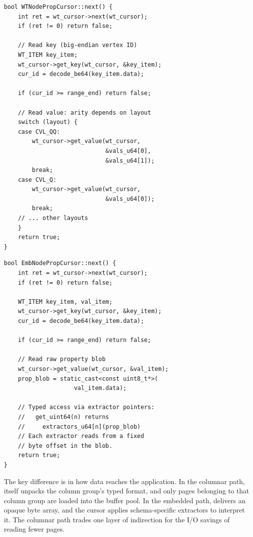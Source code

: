 \begin{lstlisting}[style=cpp, label={lst:wt-next}, caption={Columnar path: \code{WTNodePropCursor::next()}.}, captionpos=b]
bool WTNodePropCursor::next() {
    int ret = wt_cursor->next(wt_cursor);
    if (ret != 0) return false;

    // Read key (big-endian vertex ID)
    WT_ITEM key_item;
    wt_cursor->get_key(wt_cursor, &key_item);
    cur_id = decode_be64(key_item.data);

    if (cur_id >= range_end) return false;

    // Read value: arity depends on layout
    switch (layout) {
    case CVL_QQ:
        wt_cursor->get_value(wt_cursor,
                             &vals_u64[0],
                             &vals_u64[1]);
        break;
    case CVL_Q:
        wt_cursor->get_value(wt_cursor,
                             &vals_u64[0]);
        break;
    // ... other layouts
    }
    return true;
}
\end{lstlisting}

\begin{lstlisting}[style=cpp, label={lst:emb-next}, caption={Embedded path: \code{EmbNodePropCursor::next()}.}, captionpos=b]
bool EmbNodePropCursor::next() {
    int ret = wt_cursor->next(wt_cursor);
    if (ret != 0) return false;

    WT_ITEM key_item, val_item;
    wt_cursor->get_key(wt_cursor, &key_item);
    cur_id = decode_be64(key_item.data);

    if (cur_id >= range_end) return false;

    // Read raw property blob
    wt_cursor->get_value(wt_cursor, &val_item);
    prop_blob = static_cast<const uint8_t*>(
                    val_item.data);

    // Typed access via extractor pointers:
    //   get_uint64(n) returns
    //     extractors_u64[n](prop_blob)
    // Each extractor reads from a fixed
    // byte offset in the blob.
    return true;
}
\end{lstlisting}

The key difference is in how data reaches the application.
In the columnar path, \wt{} itself unpacks the column group's typed format, and only pages belonging to that column group are loaded into the buffer pool.
In the embedded path, \wt{} delivers an opaque byte array, and the cursor applies schema-specific extractors to interpret it.
The columnar path trades one layer of indirection for the I/O savings of reading fewer pages.
